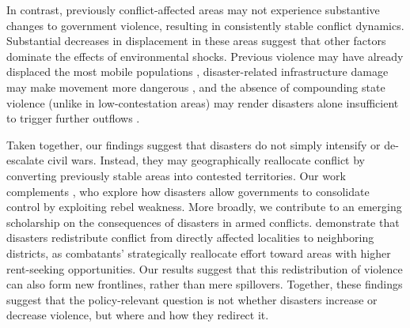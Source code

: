 \documentclass[bibtex]{article}
\begin{document}
{{\color{black} 

In contrast, previously conflict-affected areas may not experience substantive changes to government violence, resulting in consistently stable conflict dynamics. 
Substantial decreases in displacement in these areas suggest that other factors {\color{black} dominate the effects of environmental shocks. Previous violence may have already displaced the most mobile populations \citep{engel2007displacement,melander2009new}, disaster-related infrastructure damage may make movement more dangerous \citep{gray_mueller2012}, and the absence of compounding state violence (unlike in low-contestation areas) may render disasters alone insufficient to trigger further outflows \citep{abel2019,beine_parsons2015}.}

{\color{black} Taken together, our findings suggest that} disasters do not simply intensify or de-escalate civil wars. Instead, they {\color{black} may} geographically reallocate conflict by converting previously stable areas into contested territories. Our work complements \citet{zhao_2025}, who explore how disasters allow governments to consolidate control {\color{black} by exploiting rebel weakness}.
More broadly, we contribute to an emerging scholarship on the consequences of disasters in armed conflicts. \citet{amarasinghe2025disasters} demonstrate that disasters redistribute conflict from directly affected localities to neighboring districts, as combatants' strategically reallocate effort toward areas with higher rent-seeking opportunities. Our results suggest that this redistribution of violence can also form new frontlines, rather than mere spillovers. Together, these findings suggest that the policy-relevant question is not whether disasters increase or decrease violence, but where and how they redirect it.}

}
\end{document}
